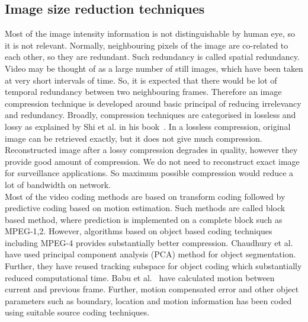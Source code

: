 \subsection{Image size reduction techniques}
\indent Most of the image intensity information is not distinguishable
by human eye, so it is not relevant. Normally, neighbouring pixels of
the image are co-related to each other, so they are redundant. Such
redundancy is called spatial redundancy. Video may be thought of as a
large number of still images, which have been taken at very short
intervals of time. So, it is expected that there would be lot of
temporal redundancy between two neighbouring frames. Therefore an image
compression technique is developed around basic principal of reducing
irrelevancy and redundancy. Broadly, compression techniques are
categorised in lossless and lossy as explained by Shi et al. in his
book~\cite{6}. In a lossless compression, original image can be
retrieved exactly, but it does not give much compression.  Reconstructed
image after a lossy compression degrades in quality, however they
provide good amount of compression. We do not need to reconstruct exact
image for surveillance applications. So maximum possible compression
would reduce a lot of bandwidth on network.\\
\indent Most of the video coding methods are based on transform coding
followed by predictive coding based on motion estimation. Such methods
are called block based method, where prediction is implemented on a
complete block such as  MPEG-1,2. However, algorithms based
on object based coding techniques~\cite{7, 8} including MPEG-4 provides
substantially better compression. Chaudhury et al.~\cite{7} have used
principal component analysis (PCA) method for object
segmentation. Further, they have reused tracking subspace for object
coding which substantially reduced computational time. Babu et al.~\cite{8}
have calculated motion between current and previous frame.
Further, motion compensated error and other object parameters such as
boundary, location and motion information has been coded using suitable
source coding techniques.
